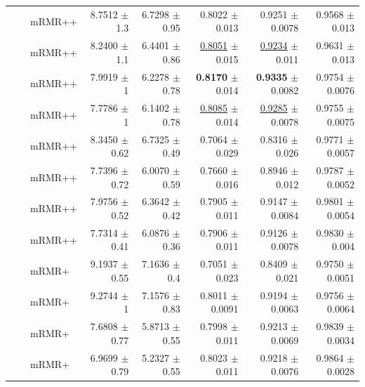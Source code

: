 \begin{longtable}{llp{}rrrrr}
 &  & mRMR++ & 8.7512 {\scriptsize $\pm$ 1.3} & 6.7298 {\scriptsize $\pm$ 0.95} & 0.8022 {\scriptsize $\pm$ 0.013} & 0.9251 {\scriptsize $\pm$ 0.0078} & 0.9568 {\scriptsize $\pm$ 0.013} \\
 &  & mRMR++ & 8.2400 {\scriptsize $\pm$ 1.1} & 6.4401 {\scriptsize $\pm$ 0.86} & \underline{0.8051} {\scriptsize $\pm$ 0.015} & \underline{0.9234} {\scriptsize $\pm$ 0.011} & 0.9631 {\scriptsize $\pm$ 0.013} \\
 &  & mRMR++ & 7.9919 {\scriptsize $\pm$ 1} & 6.2278 {\scriptsize $\pm$ 0.78} & \textbf{0.8170} {\scriptsize $\pm$ 0.014} & \textbf{0.9335} {\scriptsize $\pm$ 0.0082} & 0.9754 {\scriptsize $\pm$ 0.0076} \\
 &  & mRMR++ & 7.7786 {\scriptsize $\pm$ 1} & 6.1402 {\scriptsize $\pm$ 0.78} & \underline{0.8085} {\scriptsize $\pm$ 0.014} & \underline{0.9285} {\scriptsize $\pm$ 0.0078} & 0.9755 {\scriptsize $\pm$ 0.0075} \\
 &  & mRMR++ & 8.3450 {\scriptsize $\pm$ 0.62} & 6.7325 {\scriptsize $\pm$ 0.49} & 0.7064 {\scriptsize $\pm$ 0.029} & 0.8316 {\scriptsize $\pm$ 0.026} & 0.9771 {\scriptsize $\pm$ 0.0057} \\
 &  & mRMR++ & 7.7396 {\scriptsize $\pm$ 0.72} & 6.0070 {\scriptsize $\pm$ 0.59} & 0.7660 {\scriptsize $\pm$ 0.016} & 0.8946 {\scriptsize $\pm$ 0.012} & 0.9787 {\scriptsize $\pm$ 0.0052} \\
 &  & mRMR++ & 7.9756 {\scriptsize $\pm$ 0.52} & 6.3642 {\scriptsize $\pm$ 0.42} & 0.7905 {\scriptsize $\pm$ 0.011} & 0.9147 {\scriptsize $\pm$ 0.0084} & 0.9801 {\scriptsize $\pm$ 0.0054} \\
 &  & mRMR++ & 7.7314 {\scriptsize $\pm$ 0.41} & 6.0876 {\scriptsize $\pm$ 0.36} & 0.7906 {\scriptsize $\pm$ 0.011} & 0.9126 {\scriptsize $\pm$ 0.0078} & 0.9830 {\scriptsize $\pm$ 0.004} \\
 &  & mRMR+ & 9.1937 {\scriptsize $\pm$ 0.55} & 7.1636 {\scriptsize $\pm$ 0.4} & 0.7051 {\scriptsize $\pm$ 0.023} & 0.8409 {\scriptsize $\pm$ 0.021} & 0.9750 {\scriptsize $\pm$ 0.0051} \\
 &  & mRMR+ & 9.2744 {\scriptsize $\pm$ 1} & 7.1576 {\scriptsize $\pm$ 0.83} & 0.8011 {\scriptsize $\pm$ 0.0091} & 0.9194 {\scriptsize $\pm$ 0.0063} & 0.9756 {\scriptsize $\pm$ 0.0064} \\
 &  & mRMR+ & 7.6808 {\scriptsize $\pm$ 0.77} & 5.8713 {\scriptsize $\pm$ 0.55} & 0.7998 {\scriptsize $\pm$ 0.011} & 0.9213 {\scriptsize $\pm$ 0.0069} & 0.9839 {\scriptsize $\pm$ 0.0034} \\
 &  & mRMR+ & 6.9699 {\scriptsize $\pm$ 0.79} & 5.2327 {\scriptsize $\pm$ 0.55} & 0.8023 {\scriptsize $\pm$ 0.011} & 0.9218 {\scriptsize $\pm$ 0.0076} & 0.9864 {\scriptsize $\pm$ 0.0028} \\

\end{longtable}
